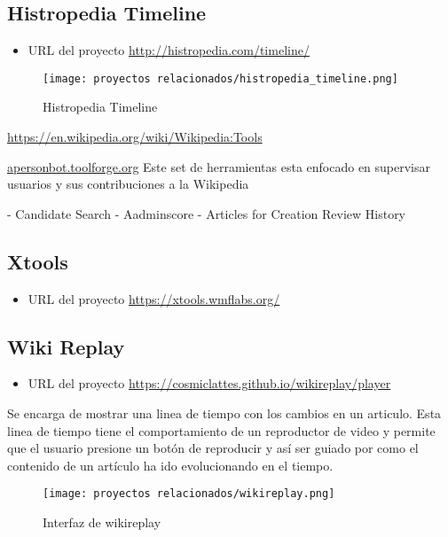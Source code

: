 
\subsection{Histropedia Timeline}

\begin{itemize}
    \item URL del proyecto \url{http://histropedia.com/timeline/}
\end{itemize}

\begin{figure}[H]
    \centering
    \texttt{[image: proyectos relacionados/histropedia\_timeline.png]}
    \caption{Histropedia Timeline}
    \label{histropedia_timeline}
\end{figure}


\url{https://en.wikipedia.org/wiki/Wikipedia:Tools}

\url{apersonbot.toolforge.org}
Este set de herramientas esta enfocado en supervisar usuarios y sus contribuciones a la Wikipedia

- Candidate Search
- Aadminscore
- Articles for Creation Review History

\subsection{Xtools}
\begin{itemize}
    \item URL del proyecto \url{https://xtools.wmflabs.org/}
\end{itemize}

\subsection{Wiki Replay}
\begin{itemize}
    \item URL del proyecto \url{https://cosmiclattes.github.io/wikireplay/player}
\end{itemize}

Se encarga de mostrar una linea de tiempo con los cambios en un articulo. Esta linea de tiempo
tiene el comportamiento de un reproductor de video y permite que el usuario presione un botón de
reproducir y así ser guiado por como el contenido de un artículo ha ido evolucionando en el tiempo.

\begin{figure}[H]
    \centering
    \texttt{[image: proyectos relacionados/wikireplay.png]}
    \caption{Interfaz de wikireplay}
    \label{wikireplay}
\end{figure}


